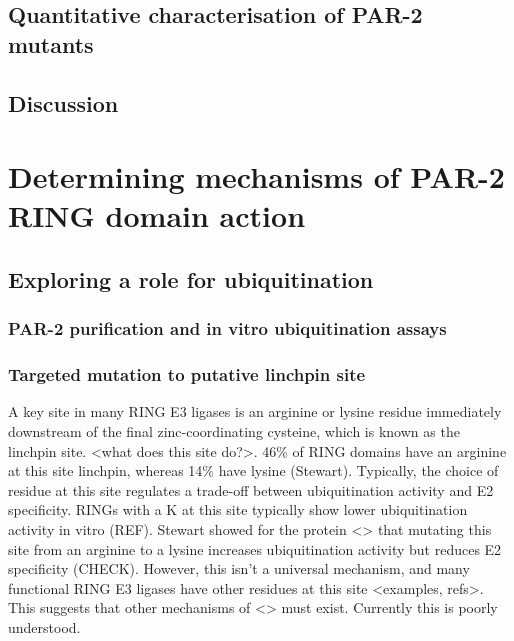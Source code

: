 \documentclass[12pt]{"article"}
\begin{document}
\clearpage
\subsection{Quantitative characterisation of PAR-2 mutants}

\subsection{Discussion}

\clearpage
\section{Determining mechanisms of PAR-2 RING domain action}


\subsection{Exploring a role for ubiquitination}

\subsubsection{PAR-2 purification and in vitro ubiquitination assays}

\clearpage
\subsubsection{Targeted mutation to putative linchpin site}

A key site in many RING E3 ligases is an arginine or lysine residue immediately downstream of the final zinc-coordinating cysteine, which is known as the linchpin site. <what does this site do?>. 46\% of RING domains have an arginine at this site linchpin, whereas 14\% have lysine (Stewart). Typically, the choice of residue at this site regulates a trade-off between ubiquitination activity and E2 specificity. RINGs with a K at this site typically show lower ubiquitination activity in vitro (REF). Stewart showed for the protein <> that mutating this site from an arginine to a lysine increases ubiquitination activity but reduces E2 specificity (CHECK). However, this isn’t a universal mechanism, and many functional RING E3 ligases have other residues at this site <examples, refs>. This suggests that other mechanisms of <> must exist. Currently this is poorly understood.\\
\end{document}
